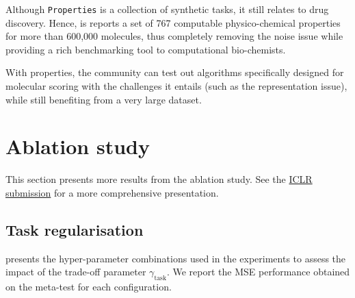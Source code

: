 Although \texttt{Properties} is a collection of synthetic tasks, it still relates to drug discovery. Hence, is reports a set of 767 computable physico-chemical properties for more than 600,000 molecules, thus completely removing the noise issue while providing a rich benchmarking tool to computational bio-chemists.

With properties, the community can test out algorithms specifically designed for molecular scoring with the challenges it entails (such as the representation issue), while still benefiting from a very large dataset.



\clearpage
\section{Ablation study}
\label{app:ablation}

This section presents more results from the ablation study. See the \href{https://openreview.net/pdf?id=Syeu8CNYvS}{ICLR submission} for a more comprehensive presentation.

\subsection{Task regularisation}
\label{app:ablation-taskreg}

 presents the hyper-parameter combinations used in the experiments to assess the impact of the trade-off parameter $\gamma_\mathrm{task}$.
We report the MSE performance obtained on the meta-test for each configuration.

